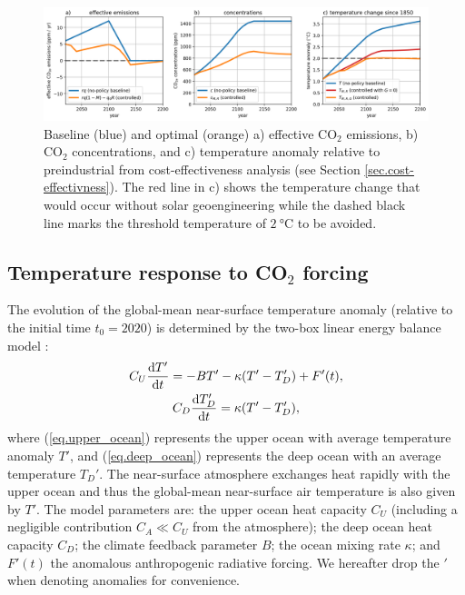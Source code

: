 \documentclass{article}
\begin{document}
\begin{figure}[htb!]
\noindent\includegraphics[width=1.0\textwidth]{figures/default-temp_carbon_and_temperatures.png}
\centering
\caption{Baseline (blue) and optimal (orange) a) effective CO$_{2}$ emissions, b) CO$_{2}$ concentrations, and c) temperature anomaly relative to preindustrial from cost-effectiveness analysis (see Section \ref{sec.cost-effectivness}). The red line in c) shows the temperature change that would occur without solar geoengineering while the dashed black line marks the threshold temperature of $\SI{2}{\celsius}$ to be avoided.}
\label{fig.temp_and_carbon}
\end{figure}

\subsection{Temperature response to CO$_{2}$ forcing}
The evolution of the global-mean near-surface temperature anomaly (relative to the initial time $t_{0} = 2020$) is determined by the two-box linear energy balance model \citep[e.g][]{gregory_vertical_2000, held_probing_2010}:
\begin{gather}
    C_{U} \dv{T'}{t} = -B T' - \kappa( T' - T_{D}') + F'(t), \label{eq.upper_ocean}
    \\
    C_{D} \dv{T_{D}'}{t} = \kappa (T' - T_{D}'),\label{eq.deep_ocean}
\end{gather}
where (\ref{eq.upper_ocean}) represents the upper ocean with average temperature anomaly $T'$, and (\ref{eq.deep_ocean}) represents the deep ocean with an average temperature $T_{D}'$. The near-surface atmosphere exchanges heat rapidly with the upper ocean and thus the global-mean near-surface air temperature is also given by $T'$. The model parameters are: the upper ocean heat capacity $C_{U}$ (including a negligible contribution $C_{A} \ll C_{U}$ from the atmosphere); the deep ocean heat capacity $C_{D}$; the climate feedback parameter $B$; the ocean mixing rate $\kappa$; and $F'(t)$ the anomalous anthropogenic radiative forcing. We hereafter drop the $'$ when denoting anomalies for convenience.
\end{document}
